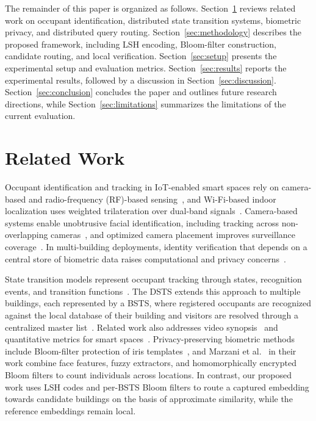 \documentclass[pdflatex,sn-mathphys-num]{sn-jnl}%
\theoremstyle{thmstyleone}%
\theoremstyle{thmstyletwo}%
\theoremstyle{thmstylethree}%
\begin{document}
The remainder of this paper is organized as follows. Section~\ref{sec:related} reviews related work on occupant identification, distributed state transition systems, biometric privacy, and distributed query routing. Section~\ref{sec:methodology} describes the proposed framework, including LSH encoding, Bloom-filter construction, candidate routing, and local verification. Section~\ref{sec:setup} presents the experimental setup and evaluation metrics. Section~\ref{sec:results} reports the experimental results, followed by a discussion in Section~\ref{sec:discussion}. Section~\ref{sec:conclusion} concludes the paper and outlines future research directions, while Section~\ref{sec:limitations} summarizes the limitations of the current evaluation.



\section{Related Work}
\label{sec:related}

Occupant identification and tracking in IoT-enabled smart spaces rely on camera-based and radio-frequency (RF)-based sensing~\cite{mohan2020,WZSYGWLLHSC2025}, and Wi-Fi-based indoor localization uses weighted trilateration over dual-band signals~\cite{MSSAB2019}. Camera-based systems enable unobtrusive facial identification, including tracking across non-overlapping cameras~\cite{nair2021}, and optimized camera placement improves surveillance coverage~\cite{SM2022}. In multi-building deployments, identity verification that depends on a central store of biometric data raises computational and privacy concerns~\cite{mohan2020}.

State transition models represent occupant tracking through states, recognition events, and transition functions~\cite{MJG2011}. The DSTS extends this approach to multiple buildings, each represented by a BSTS, where registered occupants are recognized against the local database of their building and visitors are resolved through a centralized master list~\cite{mohan2020}. Related work also addresses video synopsis~\cite{NGA2022} and quantitative metrics for smart spaces~\cite{MMJ2025}. Privacy-preserving biometric methods include Bloom-filter protection of iris templates~\cite{rathgeb2014}, and Marzani et al.~\cite{marzani2026} in their work combine face features, fuzzy extractors, and homomorphically encrypted Bloom filters to count individuals across locations. In contrast, our proposed work uses LSH codes and per-BSTS Bloom filters to route a captured embedding towards candidate buildings on the basis of approximate similarity, while the reference embeddings remain local.
\end{document}

